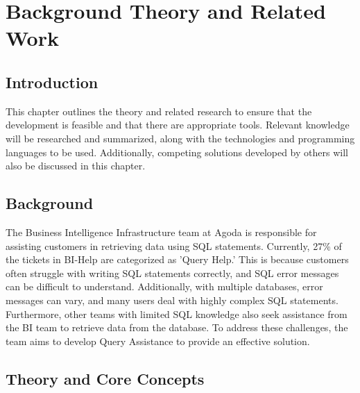 \chapter{Background Theory and Related Work}






\section{Introduction}
This chapter outlines the theory and related research to ensure that the development is feasible and that there are appropriate tools. Relevant knowledge will be researched and summarized, along with the technologies and programming languages to be used. Additionally, competing solutions developed by others will also be discussed in this chapter.

\section{Background}
The Business Intelligence Infrastructure team at Agoda is responsible for assisting customers in retrieving data using SQL statements. Currently, 27\% of the tickets in BI-Help are categorized as 'Query Help.' This is because customers often struggle with writing SQL statements correctly, and SQL error messages can be difficult to understand. Additionally, with multiple databases, error messages can vary, and many users deal with highly complex SQL statements. Furthermore, other teams with limited SQL knowledge also seek assistance from the BI team to retrieve data from the database. To address these challenges, the team aims to develop Query Assistance to provide an effective solution.
\section{Theory and Core Concepts}

